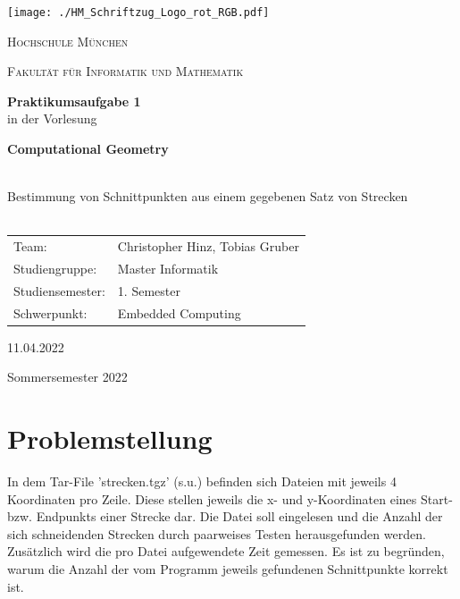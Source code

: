 \documentclass[12pt]{scrartcl}
\begin{document}
\begin{titlepage}
    \vfill
	\centering
    \texttt{[image: ./HM\_Schriftzug\_Logo\_rot\_RGB.pdf]}
    \vspace{1.5cm}

	{\scshape\LARGE Hochschule München \par}
    {\scshape\Large Fakultät für Informatik und Mathematik\par}
	\vspace{1.5cm}




    \vfill
    {\LARGE\bfseries Praktikumsaufgabe 1 \\}
    \vspace{0.5cm}
	{in der Vorlesung\\}
    \vspace{0.5cm}
    {\LARGE\bfseries Computational Geometry\\~\\ \par}
	{\LARGE Bestimmung von Schnittpunkten aus einem gegebenen Satz von Strecken\\~\\ \par}
	\vfill
    \vfill


    \begin{tabular}{ll}
    \normalsize
    Team:  & Christopher Hinz, Tobias Gruber\\
    Studiengruppe: & Master Informatik\\
    Studiensemester: & 1. Semester\\
    Schwerpunkt: & Embedded Computing\\
    \end{tabular}
    \vspace{1.5cm}

    11.04.2022

    \vspace{0.5cm}

    Sommersemester 2022

	\vfill

\end{titlepage}

\newpage

\thispagestyle{empty}
\tableofcontents
\newpage



\raggedright

\section{Problemstellung}
In dem Tar-File 'strecken.tgz' (s.u.) befinden sich Dateien mit jeweils 4 Koordinaten pro Zeile.
Diese stellen jeweils die x- und y-Koordinaten eines Start- bzw. Endpunkts einer Strecke dar.
Die Datei soll eingelesen und die Anzahl der sich schneidenden Strecken durch paarweises Testen herausgefunden werden.
Zusätzlich wird die pro Datei aufgewendete Zeit gemessen.
Es ist zu begründen, warum die Anzahl der vom Programm jeweils gefundenen Schnittpunkte korrekt ist.
\end{document}
